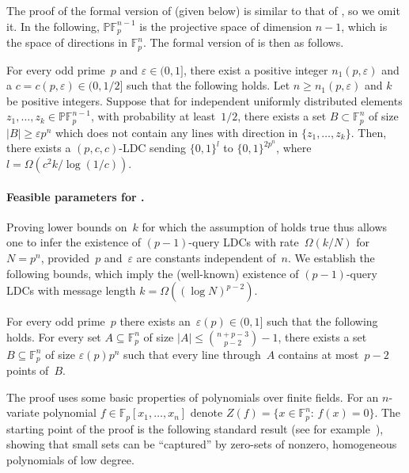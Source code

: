\documentclass{toc}
\newcommand{\bset}[1]{\{0,1\}^{#1}} %
\newcommand{\st}{:\,} %
\newcommand{\eps}{\varepsilon}
\newcommand{\F}{{\mathbb{F}}}
\newcommand{\PF}{{\mathbb{P}\mathbb{F}}}
\begin{document}
The proof of the formal version of  (given below) is similar to that of , so we omit it.
In the following, $\PF_p^{n-1}$ is the projective space of dimension $n-1$, which is the space of directions in $\F_p^n$.
The formal version of  is then as follows.

\begin{corollary}\label{cor:forbidden_directions}
For every odd prime~$p$ and $\eps \in (0,1]$, there exist a positive integer $n_1(p,\eps)$ and a $c = c(p,\eps)\in (0,1/2]$ such that the following holds.
Let $n \geq n_1(p,\eps)$ and $k$ be positive integers.
Suppose that for independent uniformly distributed elements $z_1,\dots,z_k\in\PF_p^{n-1}$, with probability at least~$1/2$, there exists a set $B\subset \F_p^n$  of size $|B|\ge \eps p^n$ which does not contain any lines with direction in $\{z_1,\dots,z_k\}$.
Then, there exists a $(p, c,c)$-LDC sending $\bset{l}$ to $\bset{2p^n}$, where $l=\Omega(c^2 k/\log(1/c))$.
\end{corollary}


%
\paragraph{Feasible parameters for .}

Proving lower bounds on~$k$ for which the assumption of  holds true thus allows one to infer the existence of $(p-1)$-query LDCs with rate~$\Omega(k/N)$ for $N = p^n$, provided~$p$ and~$\eps$ are constants independent of~$n$.
We establish the following bounds, which imply the (well-known) existence of $(p-1)$-query LDCs with message length $k = \Omega((\log N)^{p-2})$.

\begin{theorem}\label{thm:RM2}
For every odd prime~$p$ there exists an~$\eps(p)\in (0,1]$ such that the following holds.
For every set $A\subseteq \F_p^n$ of size $|A| \leq \binom{n+p-3}{p-2}-1$, there exists a set $B\subseteq \F_p^n$ of size $\eps(p) p^n$ such that every line through~$A$ contains at most~$p-2$ points of~$B$.
\end{theorem}

The proof uses some basic properties of polynomials over finite fields.
For an $n$-variate polynomial $f\in \F_p[x_1,\dots,x_n]$ denote $Z(f) = \{x\in\F_p^n\st f(x) = 0\}$.
The starting point of the proof is the following standard result (see for example~\cite{Tao:2014}), showing that small sets can be ``captured'' by zero-sets of nonzero, homogeneous polynomials of low degree.
\end{document}
